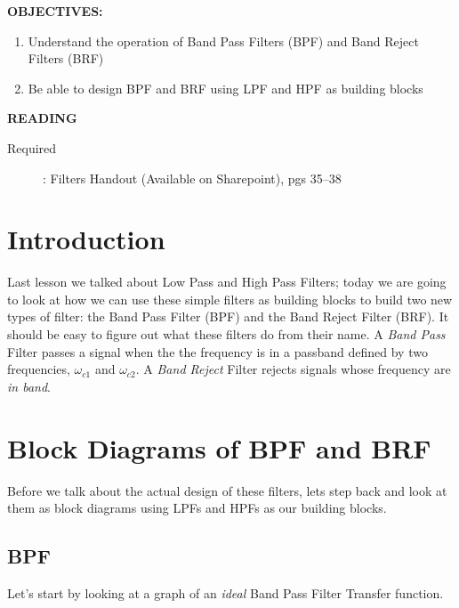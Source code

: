 \documentclass{handout}
\begin{document}
\maketitle

\textbf{OBJECTIVES:}
\begin{enumerate}
\item Understand the operation of Band Pass Filters (BPF) and Band Reject Filters (BRF)
\item Be able to design BPF and BRF using LPF and HPF as building blocks
\end{enumerate}

\textbf{READING}
\begin{description}
\item [Required]:
Filters Handout (Available on Sharepoint), pgs 35--38
\end{description}

\section{Introduction}
Last lesson we talked about Low Pass and High Pass Filters; today we are going to look at how we can use these simple filters as building blocks to build two new types of filter: the Band Pass Filter (BPF) and the Band Reject Filter (BRF).  It should be easy to figure out what these filters do from their name.  A {\em Band Pass} Filter passes a signal when the the frequency is in a passband defined by two frequencies, $\omega_{c1}$ and $\omega_{c2}$.  A {\em Band Reject} Filter rejects signals whose frequency are {\em in band}.

\section{Block Diagrams of BPF and BRF}
Before we talk about the actual design of these filters, lets step back and look at them as block diagrams using LPFs and HPFs as our building blocks.

\subsection{BPF}
Let's start by looking at a graph of an {\em ideal} Band Pass Filter Transfer function.

\end{document}
